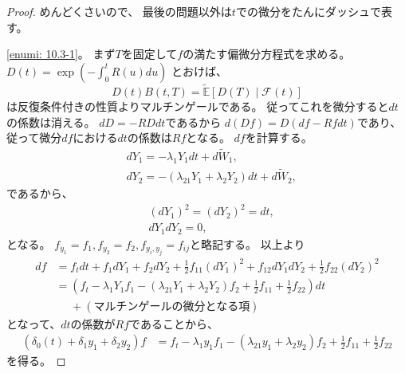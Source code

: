 \documentclass[uplatex]{jsarticle}
\theoremstyle{definition}
\def\E{\mathbb{E}}
\def\mcF{\mathcal{F}}
\begin{document}
\begin{proof}
  めんどくさいので、
  最後の問題以外は\(t\)での微分をたんにダッシュで表す。

  \ref{enumi: 10.3-1}。
  まず\(T\)を固定して\(f\)の満たす偏微分方程式を求める。
  \(D(t) = \exp\left( -\int_0^tR(u)du\right)\)
  とおけば、
  \[D(t)B(t,T) = \tilde{\E}[D(T)\mid\mcF(t)]\]
  は反復条件付きの性質よりマルチンゲールである。
  従ってこれを微分すると\(dt\)の係数は消える。
  \(dD = -RDdt\)であるから
  \(d(Df) = D(df - Rfdt)\)であり、
  従って微分\(df\)における\(dt\)の係数は\(Rf\)となる。
  \(df\)を計算する。
  \begin{align*}
    &dY_1 = -\lambda_1Y_1dt + d\tilde{W}_1, \\
    &dY_2 = -(\lambda_{21}Y_1+\lambda_2Y_2)dt + d\tilde{W}_2,
  \end{align*}
  であるから、
  \begin{align*}
    &(dY_1)^2 = (dY_2)^2 = dt, \\
    &dY_1dY_2 = 0,
  \end{align*}
  となる。
  \(f_{y_1}=f_1,f_{y_2}=f_2,f_{y_i,y_j}=f_{ij}\)と略記する。
  以上より
  \begin{align*}
    df
    &= f_tdt + f_1dY_1 + f_2dY_2 + \frac{1}{2}f_{11}(dY_1)^2
    + f_{12}dY_1dY_2 + \frac{1}{2}f_{22}(dY_2)^2 \\
    &= \left( f_t -\lambda_1Y_1f_1 -(\lambda_{21}Y_1+\lambda_2Y_2)f_2
    + \frac{1}{2}f_{11} + \frac{1}{2}f_{22}\right)dt \\
    &\ \ \ \ \ \
    + (\text{マルチンゲールの微分となる項})
  \end{align*}
  となって、\(dt\)の係数が\(Rf\)であることから、
  \begin{align*}
    (\delta_0(t)+\delta_1y_1+\delta_2y_2)f
    &= f_t -\lambda_1y_1f_1 -(\lambda_{21}y_1+\lambda_2y_2)f_2
    + \frac{1}{2}f_{11} + \frac{1}{2}f_{22}
  \end{align*}
  を得る。


\end{proof}
\end{document}
